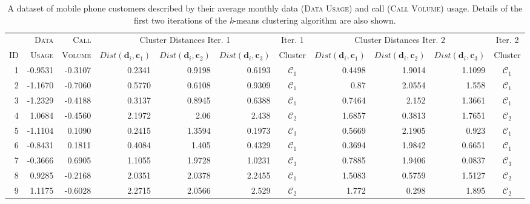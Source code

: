 \documentclass[xcolor={table}]{beamer}
\newcommand{\Toprule}[0]{\hline}
\newcommand{\Midrule}[0]{\hline}
\newcommand{\featN}[1]{\textsc{#1}}
\begin{document}
\begin{frame}[plain]
\begin{table}[!tbh]
\caption{A dataset of mobile phone customers described by their average monthly data (\featN{Data Usage}) and call (\featN{Call Volume}) usage. Details of the first two iterations of the \textit{k}-means clustering algorithm are also shown. }
\label{table:kmeansDemoData}
\begin{tiny}
{\setlength{\tabcolsep}{0.6em}
\begin{tabular*}{\textwidth}{@{\extracolsep{\fill}} rrr | rrrc | rrrc @{}}
\Toprule
~	 & \featN{Data} & \featN{Call} & \multicolumn{3}{c}{Cluster Distances Iter. 1} & Iter. 1  & \multicolumn{3}{c}{Cluster Distances Iter. 2} & Iter. 2\\
\featN{ID}	 & \featN{Usage} & \featN{Volume} & ${Dist}(\mathbf{d}_i, {\mathbf{c}_1})$ & ${Dist}(\mathbf{d}_i, {\mathbf{c}_2})$ & ${Dist}(\mathbf{d}_i, {\mathbf{c}_3})$ & Cluster & ${Dist}(\mathbf{d}_i, {\mathbf{c}_1})$ & ${Dist}(\mathbf{d}_i, {\mathbf{c}_2})$ & ${Dist}(\mathbf{d}_i, {\mathbf{c}_3})$ & Cluster\\
\Midrule
1 & -0.9531 & -0.3107 & 0.2341 & 0.9198 & 0.6193 & $\mathcal{C}_1$ & 0.4498 & 1.9014 & 1.1099 & $\mathcal{C}_1$ \\ 
2 & -1.1670 & -0.7060 & 0.5770 & 0.6108 & 0.9309 & $\mathcal{C}_1$ & 0.87 & 2.0554 & 1.558 & $\mathcal{C}_1$ \\ 
3 & -1.2329 & -0.4188 & 0.3137 & 0.8945 & 0.6388 & $\mathcal{C}_1$ & 0.7464 & 2.152 & 1.3661 & $\mathcal{C}_1$ \\ 
4 & 1.0684 & -0.4560 & 2.1972 & 2.06 & 2.438 & $\mathcal{C}_2$ & 1.6857 & 0.3813 & 1.7651 & $\mathcal{C}_2$ \\ 
5 & -1.1104 & 0.1090 & 0.2415 & 1.3594 & 0.1973 & $\mathcal{C}_3$ & 0.5669 & 2.1905 & 0.923 & $\mathcal{C}_1$ \\ 
6 & -0.8431 & 0.1811 & 0.4084 & 1.405 & 0.4329 & $\mathcal{C}_1$ & 0.3694 & 1.9842 & 0.6651 & $\mathcal{C}_1$ \\ 
7 & -0.3666 & 0.6905 & 1.1055 & 1.9728 & 1.0231 & $\mathcal{C}_3$ & 0.7885 & 1.9406 & 0.0837 & $\mathcal{C}_3$ \\ 
8 & 0.9285 & -0.2168 & 2.0351 & 2.0378 & 2.2455 & $\mathcal{C}_1$ & 1.5083 & 0.5759 & 1.5127 & $\mathcal{C}_2$ \\ 
9 & 1.1175 & -0.6028 & 2.2715 & 2.0566 & 2.529 & $\mathcal{C}_2$ & 1.772 & 0.298 & 1.895 & $\mathcal{C}_2$ \\ 

\end{tabular*}}
\end{tiny}
\end{table}
\end{frame}
\end{document}

